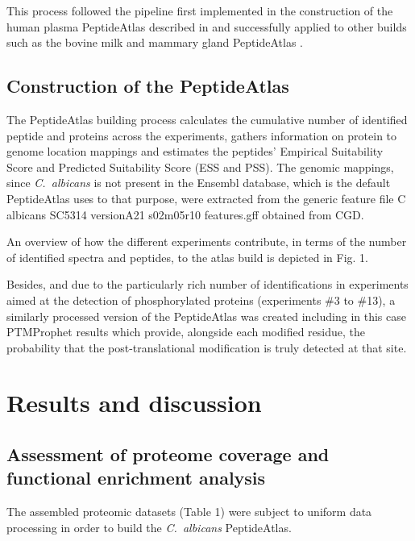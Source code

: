 This process followed the pipeline first implemented in the
construction of the human plasma PeptideAtlas described in
\citep{Farrah2011} and successfully applied to other builds such as the
bovine milk and mammary gland PeptideAtlas \citep{Bislev2012}.


\subsection*{Construction of the PeptideAtlas}

The PeptideAtlas building process calculates the cumulative
number of identified peptide and proteins across the experiments,
 gathers information on protein to genome location
mappings and estimates the peptides' Empirical Suitability
Score and Predicted Suitability Score (ESS and PSS). The genomic
mappings, since \textit{\mbox{C. albicans}} is not present in the Ensembl database,
 which is the default PeptideAtlas uses to that purpose, were
extracted from the generic feature file 
C albicans SC5314 versionA21 s02m05r10 features.gff
obtained from CGD.

An overview of how the different experiments contribute,
in terms of the number of identified spectra and peptides, to
the atlas build is depicted in Fig. 1.

Besides, and due to the particularly rich number of identifications
 in experiments aimed at the detection of phosphorylated proteins
  (experiments \#3 to \#13), a similarly processed
version of the PeptideAtlas was created including in this case
PTMProphet results which provide, alongside each modified
residue, the probability that the post-translational modification
is truly detected at that site.




\section*{Results and discussion}

\subsection*{Assessment of proteome coverage and functional enrichment analysis}

The assembled proteomic datasets (Table 1) were subject to
uniform data processing in order to build the \textit{\mbox{C. albicans}}
PeptideAtlas. 


